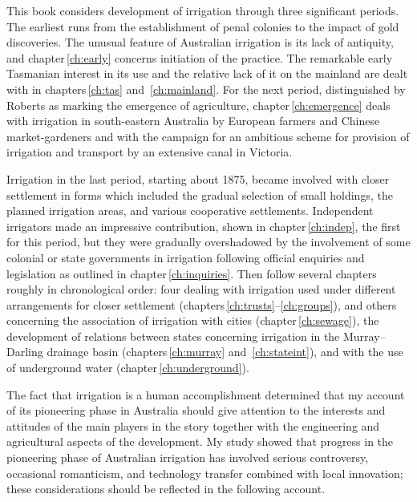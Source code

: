 This book considers development of irrigation through three
significant periods.  The earliest runs from the establishment of
penal colonies to the impact of gold discoveries.  The unusual feature
of Australian irrigation is its lack of antiquity, and
chapter\,\ref{ch:early} concerns initiation of the practice.  The
remarkable early Tasmanian interest in its use and the relative lack
of it on the mainland are dealt with in chapters\,\ref{ch:tas}
and~\ref{ch:mainland}.  For the next period, distinguished by
Roberts  as marking the emergence of
agriculture, chapter\,\ref{ch:emergence} deals with irrigation in
south-eastern Australia by European farmers and Chinese
market-gardeners and with the campaign for an ambitious scheme for
provision of irrigation and transport by an extensive canal in
Victoria.

Irrigation in the last period, starting about 1875, became involved
with closer settlement in forms which included the gradual selection
of small holdings, the planned irrigation areas, and various
cooperative settlements.  Independent irrigators made an impressive
contribution, shown in chapter\,\ref{ch:indep}, the first for this
period, but they were gradually overshadowed by the involvement of
some colonial or state governments in irrigation following official
enquiries and legislation as outlined in chapter\,\ref{ch:inquiries}.
Then follow several chapters roughly in chronological order: four
dealing with irrigation used under different arrangements for closer
settlement (chapters\,\ref{ch:trusts}--\ref{ch:groups}), and others
concerning the association of irrigation with cities
(chapter\,\ref{ch:sewage}), the development of relations between
states concerning irrigation in the Murray--Darling drainage basin
(chapters\,\ref{ch:murray} and~\ref{ch:stateint}), and with the use of
underground water (chapter\,\ref{ch:underground}).

The fact that irrigation is a human accomplishment determined that my
account of its pioneering phase in Australia should give attention to
the interests and attitudes of the main players in the story together
with the engineering and agricultural aspects of the development.  My
study showed that progress in the pioneering phase of Australian
irrigation has involved serious controversy, occasional romanticism,
and technology transfer combined with local innovation; these
considerations should be reflected in the following account.


